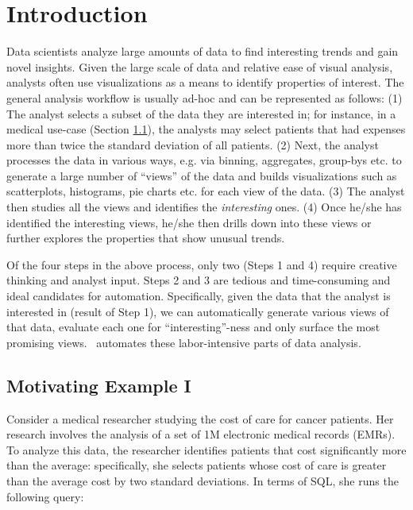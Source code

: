 \section{Introduction}
\label{sec:intro}
Data scientists analyze large amounts of data to find interesting trends and
gain novel insights. Given the large scale of data and relative ease of visual
analysis, analysts often use visualizations as a means to identify properties of
interest. The general analysis workflow is usually ad-hoc and can be represented
as follows: (1) The analyst selects a subset of the data they are interested in;
for instance, in a medical use-case (Section \ref{subsec:motivation_example1}),
the analysts may select patients that had expenses more than twice the standard
deviation of all patients. (2) Next, the analyst processes the data in various
ways, e.g. via binning, aggregates, group-bys etc. to generate a large number of
``views'' of the data and builds visualizations such as scatterplots,
histograms, pie charts etc. for each view of the data. (3) The analyst then
studies all the views and identifies the {\it interesting} ones. (4) Once he/she
has identified the interesting views, he/she then drills down into these views
or further explores the properties that show unusual trends. 

Of the four steps in the above process, only two (Steps 1 and 4) require
creative thinking and analyst input. Steps 2 and 3 are tedious and
time-consuming and ideal candidates for automation. Specifically, given the data that the analyst
is interested in (result of Step 1), we can automatically generate various
views of that data, evaluate each one for ``interesting''-ness and only surface
the most promising views. \SeeDB\ automates these labor-intensive parts of data
analysis.

\subsection{Motivating Example I}
\label{subsec:motivation_example1}

Consider a medical researcher studying the cost of care for cancer patients. Her
research involves the analysis of a set of 1M electronic medical records (EMRs).
To analyze this data, the researcher identifies patients that cost
significantly more than the average: specifically, she selects patients whose
cost of care is greater than the average cost by two standard deviations. In
terms of SQL, she runs the following query: \\

